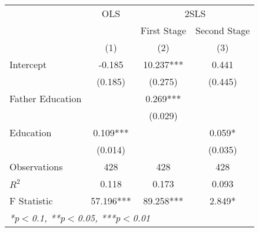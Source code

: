 

\begin{tabular}{lccc}
  \toprule
  \toprule
  & \multicolumn{1}{c}{OLS} & \multicolumn{2}{c}{2SLS} \\
  \cmidrule(lr){2-2}\cmidrule(lr){3-4}
  & \multicolumn{1}{c}{} & \multicolumn{1}{c}{First Stage} & \multicolumn{1}{c}{Second Stage} \\
   &   (1) & (2) & (3)\\
  \midrule
  Intercept & -0.185 & 10.237*** & 0.441 \\
   & (0.185) & (0.275) & (0.445) \\
  Father Education &  & 0.269*** &  \\
   &  & (0.029) &  \\
  Education & 0.109*** &  & 0.059* \\
   & (0.014) &  & (0.035) \\
  \midrule
  Observations & 428 & 428 & 428 \\
  $R^2$ & 0.118 & 0.173 & 0.093 \\
  F Statistic & 57.196*** & 89.258*** & 2.849* \\
  \bottomrule
  \multicolumn{4}{l}{{\small \textit{*p$<$0.1, **p$<$0.05, ***p$<$0.01}}}\\
\end{tabular}
